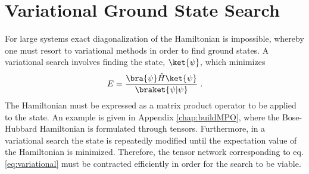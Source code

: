 \section{Variational Ground State Search}
For large systems exact diagonalization of the Hamiltonian is impossible, whereby one must resort to variational methods in order to find ground states. A variational search involves finding the state, $\ket{\psi}$, which minimizes
\begin{equation}
	E = \frac{\bra{\psi} \hat{H} \ket{\psi}}{\braket{\psi | \psi}} \; .
	\label{eq:variational}
\end{equation}
The Hamiltonian must be expressed as a matrix product operator to be applied to the state. An example is given in Appendix \ref{chap:buildMPO}, where the Bose-Hubbard Hamiltonian is formulated through tensors. Furthermore, in a variational search the state is repeatedly modified until the expectation value of the Hamiltonian is minimized. Therefore, the tensor network corresponding to eq. \ref{eq:variational} must be contracted efficiently in order for the search to be viable.


